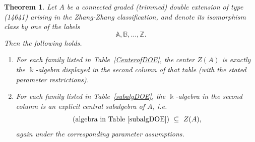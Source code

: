 \documentclass{amsart}
\newtheorem{theorem}{Theorem}[section]
\theoremstyle{definition}
\theoremstyle{remark}
\numberwithin{equation}{section}
\begin{document}
\begin{theorem}\label{thm:center-main}
Let $A$ be a connected graded (trimmed) double extension of type {\rm (}14641{\rm )} arising in the Zhang-Zhang classification, and denote its isomorphism class by one of the labels
\[
\mathbb{A},\mathbb{B},\ldots,\mathbb{Z}.
\]
Then the following holds.

\begin{enumerate}
\item[\rm (1)] For each family listed in Table~\ref{CenterofDOE}, the center $Z(A)$ is \emph{exactly} the $\Bbbk$-algebra displayed in the second column of that table (with the stated parameter restrictions).

\item[\rm (2)] For each family listed in Table~\ref{subalgDOE}, the  $\Bbbk$-algebra in the second column is an explicit central subalgebra of $A$, i.e.
\[
\text{(algebra in Table~\ref{subalgDOE})}\ \subseteq\ Z(A),
\]
again under the corresponding parameter assumptions.
\end{enumerate}
\end{theorem}
\end{document}
